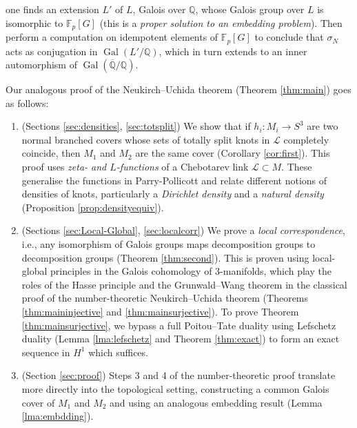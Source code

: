 \documentclass{amsart}
\theoremstyle{plain}
\theoremstyle{definition}
\theoremstyle{plain}
\theoremstyle{plain}
\theoremstyle{plain}
\theoremstyle{remark}
\theoremstyle{remark}
\theoremstyle{plain}
\theoremstyle{definition}
\theoremstyle{plain}
\DeclareMathOperator{\Gal}{\mathrm{Gal}}
\newcounter{main}
\theoremstyle{plain}
\theoremstyle{plain}
\numberwithin{equation}{section}
\begin{document}
\begin{enumerate}
\begin{center}
    \end{center}
    one finds an extension $L'$ of $L$, Galois over $\mathbb{Q}$, whose Galois group over $L$ is isomorphic to $\mathbb{F}_p[G]$ (this is a \emph{proper solution to an embedding problem}). Then perform a computation on idempotent elements of $\mathbb{F}_p[G]$ to conclude that $\sigma_N$ acts as conjugation in $\Gal(L'/\mathbb{Q})$, which in turn extends to an inner automorphism of $\Gal(\overline{\mathbb{Q}}/\mathbb{Q})$.
\end{enumerate}
Our analogous proof of the Neukirch--Uchida theorem (Theorem \ref{thm:main}) goes as follows:
\begin{enumerate}
    \item (Sections \ref{sec:densities}, \ref{sec:totsplit}) We show that if $h_i: M_i \to S^3$ are two normal branched covers whose sets of totally split knots in $\mathcal{L}$ completely coincide, then $M_1$ and $M_2$ are the same cover (Corollary \ref{cor:first}). This proof uses \emph{zeta- and $L$-functions} of a Chebotarev link $\mathcal{L} \subset M$. These generalise the functions in Parry-Pollicott \cite{parry1990zeta} and relate different notions of densities of knots, particularly a \emph{Dirichlet density} and a \emph{natural density} (Proposition \ref{prop:densityequiv}). 
    \item (Sections \ref{sec:Local-Global}, \ref{sec:localcorr}) We prove a \emph{local correspondence}, i.e., any isomorphism of Galois groups maps decomposition groups to decomposition groups (Theorem \ref{thm:second}). This is proven using local-global principles in the Galois cohomology of 3-manifolds, which play the roles of the Hasse principle and the Grunwald--Wang theorem in the classical proof of the number-theoretic Neukirch--Uchida theorem (Theorems \ref{thm:maininjective} and \ref{thm:mainsurjective}). To prove Theorem \ref{thm:mainsurjective}, we bypass a full Poitou--Tate duality using Lefschetz duality (Lemma \ref{lma:lefschetz} and Theorem \ref{thm:exact}) to form an exact sequence in $H^1$ which suffices. 
    \item (Section \ref{sec:proof}) Steps 3 and 4 of the number-theoretic proof translate more directly into the topological setting, constructing a common Galois cover of $M_1$ and $M_2$ and using an analogous embedding result (Lemma \ref{lma:embdding}). 
\end{enumerate}
\end{document}
